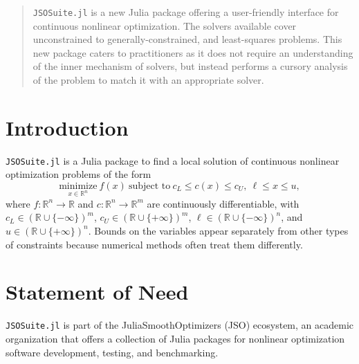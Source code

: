 \documentclass{juliacon}
\begin{document}


\maketitle

\begin{abstract}

\texttt{JSOSuite.jl} is a new Julia package offering a user-friendly interface for continuous nonlinear optimization.
The solvers available cover unconstrained to generally-constrained, and least-squares problems.
This new package caters to practitioners as it does not require an understanding of the inner mechanism of solvers, but instead performs a cursory analysis of the problem to match it with an appropriate solver.

\end{abstract}

\section{Introduction}

\texttt{JSOSuite.jl} is a Julia \cite{bezanson2017julia} package to find a local solution of continuous nonlinear optimization problems of the form
\begin{equation}\label{eq:nlp}
    \underset{x \in \mathbb{R}^{n}}{\text{minimize}} \ f(x) \ \text{subject to} \ c_L \leq c(x)  \leq c_U, \ \ell \leq x \leq u,
\end{equation}
where \(f:\mathbb{R}^n\to\mathbb{R}\) and  \(c:\mathbb{R}^n\to\mathbb{R}^m\) are continuously differentiable, with \(c_L \in \left(\mathbb{R} \cup \{-\infty\} \right)^{m}\),  \(c_U \in \left(\mathbb{R} \cup \{+\infty\} \right)^{m}\),  \(\ell \in \left(\mathbb{R} \cup \{-\infty\} \right)^n\), and  \(u \in \left(\mathbb{R} \cup \{+\infty\} \right)^n\).
Bounds on the variables appear separately from other types of constraints because numerical methods often treat them differently.

\section{Statement of Need}

\texttt{JSOSuite.jl} is part of the JuliaSmoothOptimizers (JSO) ecosystem, an academic organization that offers a collection of Julia packages for nonlinear optimization software development, testing, and benchmarking.
\end{document}
